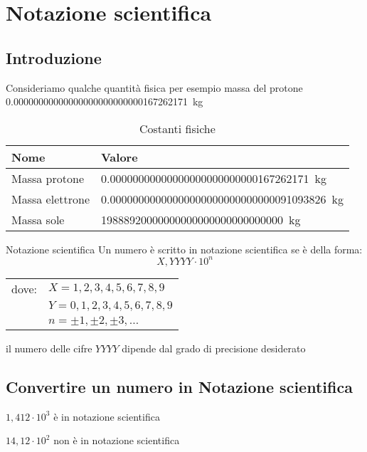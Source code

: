 \chapter{Notazione scientifica}
\section{Introduzione}
Consideriamo qualche quantità fisica per esempio massa del protone \SI{0,00000000000000000000000000167262171}{\kilogram}


\begin{table}
	\centering
	\begin{tabular}{ls}
		\toprule
		Nome&Valore\\
		\midrule
	Massa protone&\SI{0,00000000000000000000000000167262171}{\kilogram}\\
	Massa elettrone&\SI{0,00000000000000000000000000000091093826}{\kilogram}\\
	Massa sole&\SI{19888920000000000000000000000000}{\kilogram}\\
		\bottomrule
	\end{tabular}
\caption{Costanti fisiche}
\label{tab:costantifisiche1}
\end{table}
\label{cha:NotazioneScientifica}
\begin{definizionet}{Notazione scientifica}{}
Un numero è scritto in notazione scientifica se è della forma:
\[X,YYYY \cdot 10^n \]
\begin{tabular}{ll}
dove:&    $X=1,2,3,4,5,6,7,8,9$  \\ 
	    &     $ Y=0,1,2,3,4,5,6,7,8,9$ \\ 
	   &  $n=\pm 1, \pm 2,\pm 3,\ldots$\\
\end{tabular}
 
il numero delle cifre $YYYY$ dipende dal grado di precisione desiderato
\end{definizionet}
\section{Convertire un numero in Notazione scientifica}
\begin{esempiot}{}{}
	$1,412\cdot 10^3$ è in notazione scientifica
	
	$14,12\cdot 10^2$ non è in notazione scientifica
\end{esempiot}
